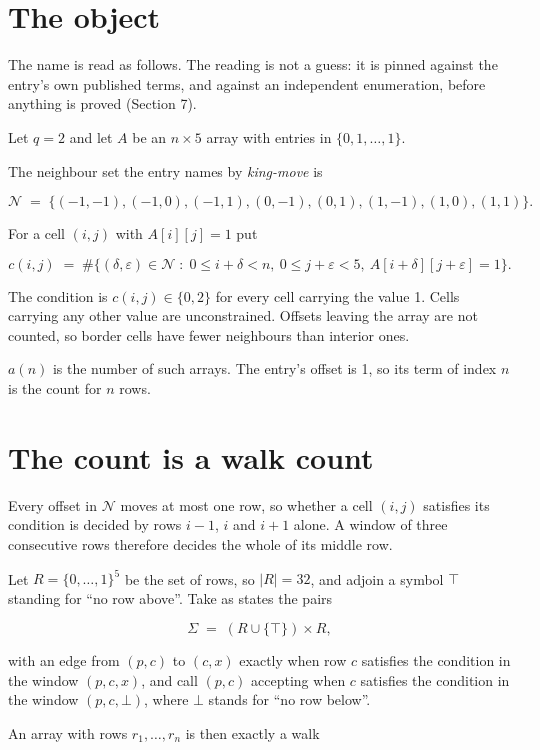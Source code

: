 \documentclass[11pt]{article}
\theoremstyle{definition}
\begin{document}
\section{The object}

The name is read as follows. The reading is not a guess: it is pinned against the entry's own published terms, and against an independent enumeration, before anything is proved (Section 7).

Let $q = 2$ and let $A$ be an $n \times 5$ array with entries in $\{0,1,\dots,1\}$.

The neighbour set the entry names by {\itshape king-move} is

\[\mathcal{N} \;=\; \{(-1,-1), (-1,0), (-1,1), (0,-1), (0,1), (1,-1), (1,0), (1,1)\}.\]

For a cell $(i,j)$ with $A[i][j] = 1$ put

\[c(i,j) \;=\; \#\bigl\{(\delta,\varepsilon)\in\mathcal{N} \;:\; 0\le i+\delta<n,\ 0\le j+\varepsilon<5,\ A[i+\delta][j+\varepsilon] = 1\bigr\}.\]

The condition is $c(i,j) \in \{0, 2\}$ for every cell carrying the value 1. Cells carrying any other value are unconstrained. Offsets leaving the array are not counted, so border cells have fewer neighbours than interior ones.

$a(n)$ is the number of such arrays. The entry's offset is 1, so its term of index $n$ is the count for $n$ rows.

\section{The count is a walk count}

Every offset in $\mathcal{N}$ moves at most one row, so whether a cell $(i,j)$ satisfies its condition is decided by rows $i-1$, $i$ and $i+1$ alone. A window of three consecutive rows therefore decides the whole of its middle row.

Let $R = \{0,\dots,1\}^{5}$ be the set of rows, so $|R| = 32$, and adjoin a symbol $\top$ standing for ``no row above''. Take as states the pairs

\[\Sigma \;=\; (R \cup \{\top\}) \times R,\]

with an edge from $(p,c)$ to $(c,x)$ exactly when row $c$ satisfies the condition in the window $(p,c,x)$, and call $(p,c)$ accepting when $c$ satisfies the condition in the window $(p,c,\bot)$, where $\bot$ stands for ``no row below''.

An array with rows $r_1,\dots,r_n$ is then exactly a walk
\end{document}
